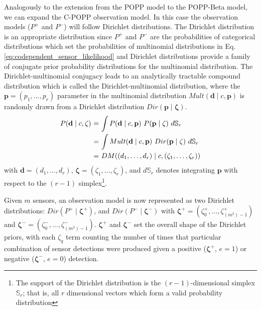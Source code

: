 Analogously to the extension from the POPP model to the POPP-Beta model, we can expand the C-POPP observation model. In this case the observation models ($P^+$ and $P^-$) will follow Dirichlet distributions. The Dirichlet distribution is an appropriate distribution since $P^+$ and $P^-$ are the probabilities of categorical distributions which set the probabilities of multinomial distributions in Eq. \ref{eq:codependent_sensor_likelihood} and Dirichlet distributions provide a family of conjugate prior probability distributions for the multinomial distribution. The Dirichlet-multinomial conjugacy leads to an analytically tractable compound distribution which is called the Dirichlet-multinomial distribution, where the $\mathbf{p} = (p_1, \ldots, p_r)$ parameter in the multinomial distribution $Mult(\mathbf{d} \mid c, \mathbf{p})$ is randomly drawn from a Dirichlet distribution $Dir(\mathbf{p} \mid \mathbf{\zeta})$. 
\begin{equation}
	\label{eq:beta_binomial_revisit}
	\begin{tabular}{r@{ = }l}
        $P(\mathbf{d} \mid c, \mathbf{\zeta})$ & $\displaystyle\int P(\mathbf{d} \mid c, \mathbf{p}) ~ P(\mathbf{p} \mid \mathbf{\zeta}) ~d\mathbb S_r$ \\ [2ex]
        & $\displaystyle\int Mult(\mathbf{d} \mid c, \mathbf{p}) ~ Dir(\mathbf{p} \mid \mathbf{\zeta}) ~d\mathbb S_r$ \\ [2ex]
        & $DM((d_1, \ldots, d_r) \mid c, (\zeta_1, \ldots, \zeta_r))$
	\end{tabular}
\end{equation}
\noindent with $\mathbf{d} = (d_1, \ldots, d_r)$, $\mathbf{\zeta} = (\zeta_1, \ldots, \zeta_r)$, and $d\mathbb S_r$ denotes integrating $\mathbf{p}$ with respect to the $(r - 1)$ simplex\footnote{The support of the Dirichlet distribution is the $(r - 1)$-dimensional simplex $\mathbb S_r$; that is, all $r$ dimensional vectors which form a valid probability distribution}.

Given $m$ sensors, an observation model is now represented as two Dirichlet distributions: $Dir(P^+ \mid \mathbf{\zeta^+})$, and $Dir(P^- \mid \mathbf{\zeta^-})$ with $\mathbf{\zeta^+} = (\zeta^+_0, \ldots, \zeta^+_{(m^2)-1})$ and $\mathbf{\zeta^-} = (\zeta^-_0, \ldots, \zeta^-_{(m^2)-1})$. $\mathbf{\zeta^+}$ and $\mathbf{\zeta^-}$ set the overall shape of the Dirichlet priors, with each $\zeta_q$ term counting the number of times that particular combination of sensor detections were produced given a positive ($\mathbf{\zeta^+}$, $e=1$) or negative ($\mathbf{\zeta^-}$, $e=0$) detection.

